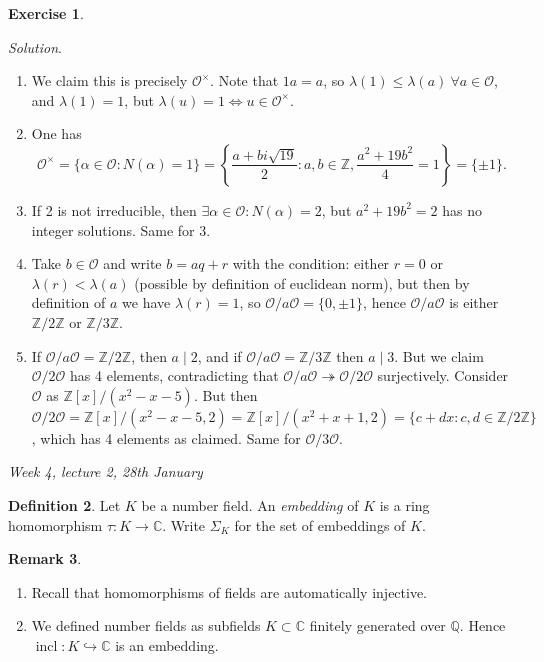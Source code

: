 \documentclass{article}
\newcommand{\Z}{\mathbb{Z}}
\newcommand{\Q}{\mathbb{Q}}
\newcommand{\C}{\mathbb{C}}
\newcommand{\ri}{\mathcal{O}}
\theoremstyle{definition}
\newtheorem{defn}{Definition}[subsection]
\newtheorem{exe}[defn]{Exercise}
\newtheorem{remark}[defn]{Remark}
\begin{document}
\begin{exe}
\begin{enumerate}
\textit{Solution}.
\begin{enumerate}
\item We claim this is precisely $\ri^\times$. Note that $1a=a$, so $\lambda(1)\leq\lambda(a) \ \forall a\in\ri$, and $\lambda(1)=1$, but $\lambda(u)=1\iff u\in\ri^\times$.
\item One has
\[
\ri^\times=\{\alpha\in\ri:N(\alpha)=1\}=\left\{\frac{a+bi\sqrt{19}}{2}:a,b\in\Z,\frac{a^2+19b^2}{4}=1\right\}=\{\pm 1\}.
\]
\item If 2 is not irreducible, then $\exists\alpha\in\ri :N(\alpha)=2$, but $a^2+19b^2=2$ has no integer solutions. Same for 3.
\item Take $b\in\ri$ and write $b=aq+r$ with the condition: either $r=0$ or $\lambda(r)<\lambda(a)$ (possible by definition of euclidean norm), but then by definition of $a$ we have $\lambda(r)=1$, so $\ri/a\ri=\{0,\pm 1\}$, hence $\ri/a\ri$ is either $\Z/2\Z$ or $\Z/3\Z$.
\item If $\ri/a\ri=\Z/2\Z$, then $a\mid 2$, and if $\ri/a\ri=\Z/3\Z$ then $a\mid 3$. But we claim $\ri/2\ri$ has 4 elements, contradicting that $\ri/a\ri\twoheadrightarrow\ri/2\ri$ surjectively. Consider $\ri$ as $\Z[x]/(x^2-x-5)$. But then $\ri/2\ri=\Z[x]/(x^2-x-5,2)=\Z[x]/(x^2+x+1,2)=\{c+dx:c,d\in\Z/2\Z\}$, which has 4 elements as claimed. Same for $\ri/3\ri$.
\end{enumerate}
\end{enumerate}
\end{exe}

\begin{flushright}
\textit{Week 4, lecture 2, 28th January}
\end{flushright}

\begin{defn}
Let $K$ be a number field. An \textit{embedding} of $K$ is a ring homomorphism $\tau:K\rightarrow\C$. Write $\Sigma_K$ for the set of embeddings of $K$.
\end{defn}

\begin{remark}
\begin{enumerate}
\item Recall that homomorphisms of fields are automatically injective.
\item We defined number fields as subfields $K\subset\C$ finitely generated over $\Q$. Hence $\operatorname{incl}:K\hookrightarrow\C$ is an embedding.
\end{enumerate}
\end{remark}
\end{document}
